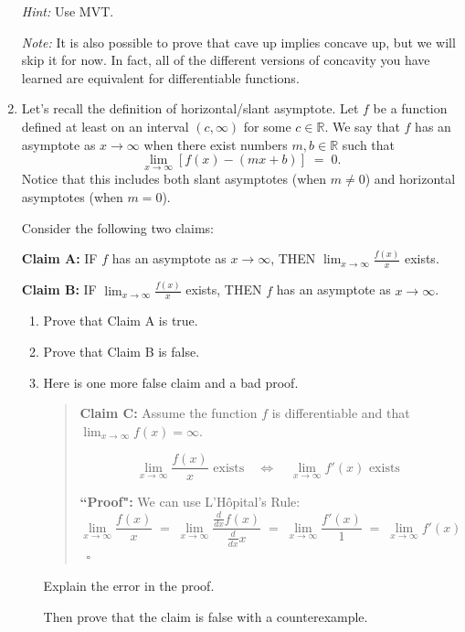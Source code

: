 \documentclass[12pt]{exam}
\newcommand {\DS} [1] {${\displaystyle #1}$}
\newcommand{\vv}{\vspace{.1cm}}
\newcommand{\R}{\mathbb{R}}
\begin{document}
\begin{enumerate}
\emph{Hint:}  Use MVT.

\emph{Note:}  It is also possible to prove that cave up implies concave up, but we will skip it for now.  In fact, all of the different versions of concavity you have learned are equivalent for differentiable functions.	

\vv

\item  Let's recall the definition of horizontal/slant asymptote.  Let $f$ be a function defined at least on an interval $(c,\infty)$ for some $c \in \R$.
We say that $f$ has an asymptote as $x \to \infty$ when there exist numbers $m, b \in \R$ such that
	$$	
		\lim_{x \to \infty} \left[ f(x) - \left( mx + b \right) \right] \; = \; 0.
	$$
Notice that this includes both slant asymptotes (when $m \neq 0$) and horizontal asymptotes (when $m =0$).
	
Consider the following two claims:	
			\begin{center}
				{\bf Claim A:} \quad \quad
					IF $f$ has an asymptote as $x \to \infty$,  \quad
					THEN \DS{\lim_{x \to \infty} \frac{f(x)}{x}} exists.
				
				{\bf Claim B:} \quad \quad 		
					IF \DS{\lim_{x \to \infty} \frac{f(x)}{x}} exists, \quad
					THEN $f$ has an asymptote as $x \to \infty$.
			\end{center}
	\begin{enumerate}
		\item Prove that Claim A is true.
		\item Prove that Claim B is false.

		\item  Here is one more false claim and a bad proof.
			\begin{quotation}
				\noindent
				{\bf Claim C:} Assume the function $f$ is differentiable and that \DS{\lim_{x \to \infty} f(x) = \infty}.
				
				$$  \lim_{x \to \infty} \frac{f(x)}{x} \mbox{ exists} \quad \iff \quad \lim_{x \to \infty} f'(x) \mbox{ exists } $$
				
				
				\noindent
				{\bf ``Proof":}  We can use L'H\^{o}pital's Rule:
					$$
						\lim_{x \to \infty} \frac{f(x)}{x} \; = \; \lim_{x \to \infty} \frac{\frac{d}{dx} f(x)}{\frac{d}{dx} x} 
							\; = \; \lim_{x \to \infty} \frac{f'(x)}{1} \; = \; \lim_{x \to \infty} f'(x)
					$$
					\ \hfill $\square$
			\end{quotation}
			Explain the  error in the proof.
			
			Then prove that the claim is false with a counterexample.
	\end{enumerate}

\end{enumerate}
\end{document}
